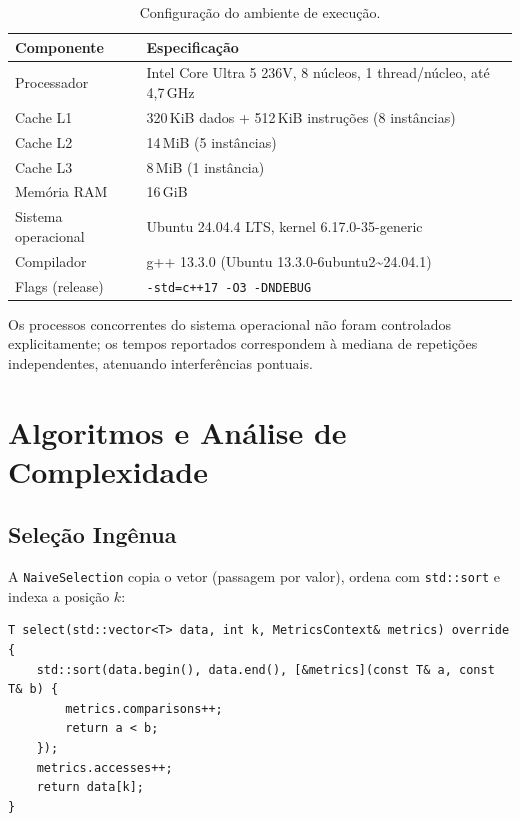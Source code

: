 \documentclass{infufrgs}
\begin{document}
\begin{table}[H]
\centering
\caption{Configuração do ambiente de execução.}
\label{tab:ambiente}
\begin{tabular}{ll}
\toprule
\textbf{Componente} & \textbf{Especificação} \\
\midrule
Processador   & Intel Core Ultra 5 236V, 8 núcleos, 1 thread/núcleo, até 4{,}7\,GHz \\
Cache L1      & 320\,KiB dados + 512\,KiB instruções (8 instâncias) \\
Cache L2      & 14\,MiB (5 instâncias) \\
Cache L3      & 8\,MiB (1 instância) \\
Memória RAM   & 16\,GiB \\
Sistema operacional & Ubuntu 24.04.4 LTS, kernel 6.17.0-35-generic \\
Compilador    & g++ 13.3.0 (Ubuntu 13.3.0-6ubuntu2\textasciitilde24.04.1) \\
Flags (release) & \texttt{-std=c++17 -O3 -DNDEBUG} \\
\bottomrule
\end{tabular}
\end{table}

Os processos concorrentes do sistema operacional não foram controlados explicitamente; os tempos reportados correspondem à mediana de repetições independentes, atenuando interferências pontuais.

\section{Algoritmos e Análise de Complexidade}

\subsection{Seleção Ingênua}

A \texttt{NaiveSelection} copia o vetor (passagem por valor), ordena com \texttt{std::sort} e indexa a posição $k$:

\begin{lstlisting}[caption={Núcleo de NaiveSelection.h}]
T select(std::vector<T> data, int k, MetricsContext& metrics) override {
    std::sort(data.begin(), data.end(), [&metrics](const T& a, const T& b) {
        metrics.comparisons++;
        return a < b;
    });
    metrics.accesses++;
    return data[k];
}
\end{lstlisting}
\end{document}
